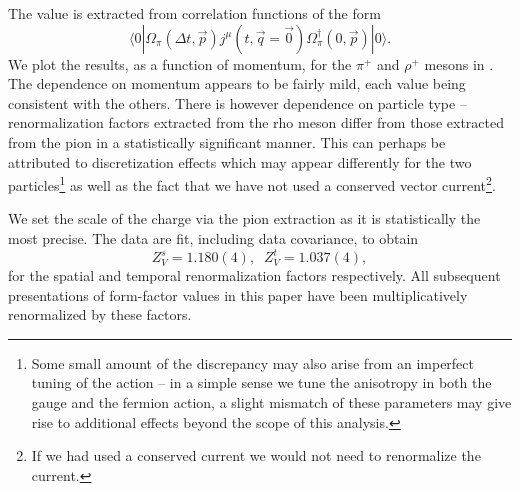 The value is extracted from correlation functions of the form 
\begin{equation*}
\langle 0 | \Omega_\pi(\Delta t, \vec{p})  j^\mu(t,\vec{q}=\vec{0}) \Omega_\pi^\dagger(0,\vec{p}) | 0 \rangle.
\end{equation*}
 We plot the results, as a function of momentum, for the $\pi^+$ and $\rho^+$ mesons in . The dependence on momentum appears to be fairly mild, each value being consistent with the others. There is however dependence on particle type -- renormalization factors extracted from the rho meson differ from those extracted from the pion in a statistically significant manner. This can perhaps be attributed to discretization effects which may appear differently for the two particles\footnote{Some small amount of the discrepancy may also arise from an imperfect tuning of the action -- in a simple sense we tune the anisotropy in both the gauge and the fermion action, a slight mismatch of these parameters may give rise to additional effects beyond the scope of this analysis.} as well as the fact that we have not used a conserved vector current\footnote{If we had used a conserved current we would not need to renormalize the current.}.


We set the scale of the charge via the pion extraction as it is statistically the most precise. The data are fit, including data covariance, to obtain 
\begin{equation}
	Z_V^s = 1.180(4), \;\; Z_V^t = 1.037(4),
\end{equation}
for the spatial and temporal renormalization factors respectively. All subsequent presentations of form-factor values in this paper have been multiplicatively renormalized by these factors.








